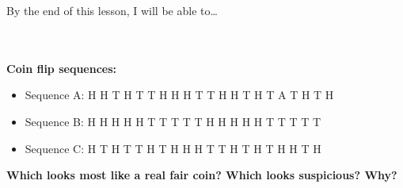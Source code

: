 \documentclass[10pt]{article}
\begin{document}
\namedateperiod

\vspace{0.12in}

\begin{objectivebox}
\small By the end of this lesson, I will be able to\dots\\[4pt]
\writeline\\[1pt]
\writeline\\[1pt]
\writeline
\end{objectivebox}

\vspace{0.1in}

\begin{vocabbox}
\end{vocabbox}

\vspace{0.1in}

\begin{hookbox}
\small\textbf{Coin flip sequences:}
\begin{itemize}[leftmargin=1.5em, itemsep=3pt]
  \item Sequence A: H H T H T T H H H T T H H T H T A T H T H
  \item Sequence B: H H H H H T T T T T H H H H H T T T T T
  \item Sequence C: H T H T T H T H H H T T H T H T H H T H
\end{itemize}
\textbf{Which looks most like a real fair coin? Which looks suspicious? Why?}\\[4pt]
\writeline\\[1pt]\writeline
\end{hookbox}

\vspace{0.1in}
\end{document}
